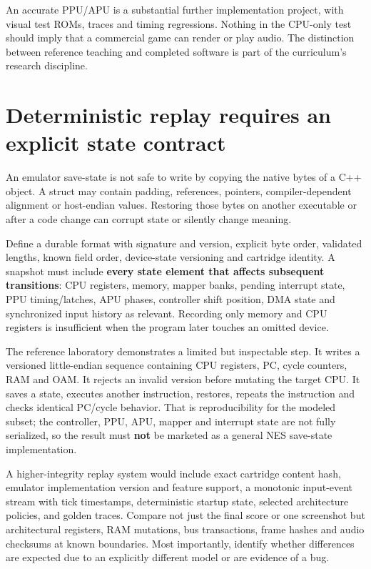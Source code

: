 An accurate PPU/APU is a substantial further implementation project, with visual test ROMs, traces and timing regressions. Nothing in the CPU-only test should imply that a commercial game can render or play audio. The distinction between reference teaching and completed software is part of the curriculum's research discipline.

\section{Deterministic replay requires an explicit state contract}\label{01-foundations-i-ch016-deterministic-replay-requires-an-explicit-state-contract}

An emulator save-state is not safe to write by copying the native bytes of a C++ object. A struct may contain padding, references, pointers, compiler-dependent alignment or host-endian values. Restoring those bytes on another executable or after a code change can corrupt state or silently change meaning.

Define a durable format with signature and version, explicit byte order, validated lengths, known field order, device-state versioning and cartridge identity. A snapshot must include \textbf{every state element that affects subsequent transitions}: CPU registers, memory, mapper banks, pending interrupt state, PPU timing/latches, APU phases, controller shift position, DMA state and synchronized input history as relevant. Recording only memory and CPU registers is insufficient when the program later touches an omitted device.

The reference laboratory demonstrates a limited but inspectable step. It writes a versioned little-endian sequence containing CPU registers, PC, cycle counters, RAM and OAM. It rejects an invalid version before mutating the target CPU. It saves a state, executes another instruction, restores, repeats the instruction and checks identical PC/cycle behavior. That is reproducibility for the modeled subset; the controller, PPU, APU, mapper and interrupt state are not fully serialized, so the result must \textbf{not} be marketed as a general NES save-state implementation.

A higher-integrity replay system would include exact cartridge content hash, emulator implementation version and feature support, a monotonic input-event stream with tick timestamps, deterministic startup state, selected architecture policies, and golden traces. Compare not just the final score or one screenshot but architectural registers, RAM mutations, bus transactions, frame hashes and audio checksums at known boundaries. Most importantly, identify whether differences are expected due to an explicitly different model or are evidence of a bug.

